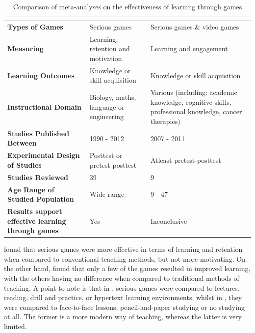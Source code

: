 \documentclass[a4paper,11.5pt]{report}
\numberwithin{figure}{section}
\numberwithin{table}{section}
\numberwithin{equation}{section}
\numberwithin{equation}{section}
\begin{document}
\begin{table}[H]
\centering
\caption{Comparison of meta-analyses on the effectiveness of learning through games}
\label{tab:effectivess learning comparison}
\begin{tabular}{p{3.4cm} | p{5cm} | p{5cm}}
       & \textbf{\citet{Pieter2013}}                  & \textbf{\citet{Girard2013}}               \\ \hline
\textbf{Types of Games}  & Serious games                & Serious games \& video games               
\\ \hline
\textbf{Measuring}   & Learning, retention and motivation                   & Learning and engagement              
\\ \hline
\textbf{Learning Outcomes}	& Knowledge or skill acquisition 	& Knowledge or skill acquisition
\\ \hline
\textbf{Instructional Domain}	& Biology, maths, language or engineering	& Various (including: academic knowledge, cognitive skills, professional knowledge, cancer therapies)
\\ \hline
\textbf{Studies Published Between}		& 1990 - 2012		& 2007 - 2011
\\ \hline
\textbf{Experimental Design of Studies}		& Posttest or pretest-posttest		& Atleast pretest-posttest
\\ \hline
\textbf{Studies Reviewed} & 39                         & 9		                 
\\ \hline
\textbf{Age Range of Studied Population} & Wide range                         & 9 - 47		                 
\\ \hline
\textbf{Results support effective learning through games} & Yes                         & Inconclusive
\end{tabular}
\end{table}


\citeauthor{Pieter2013} found that serious games were more effective in terms of learning and retention when compared to conventional teaching methods, but not more motivating. On the other hand, \citeauthor{Girard2013} found that only a few of the games resulted in improved learning, with the others having no difference when compared to traditional methods of teaching. A point to note is that in \citet{Pieter2013}, serious games were compared to lectures, reading, drill and practice, or hypertext learning environments, whilst in \citet{Girard2013}, they were compared to face-to-face lessons, pencil-and-paper studying or no studying at all. The former is a more modern way of teaching, whereas the latter is very limited.
\end{document}
